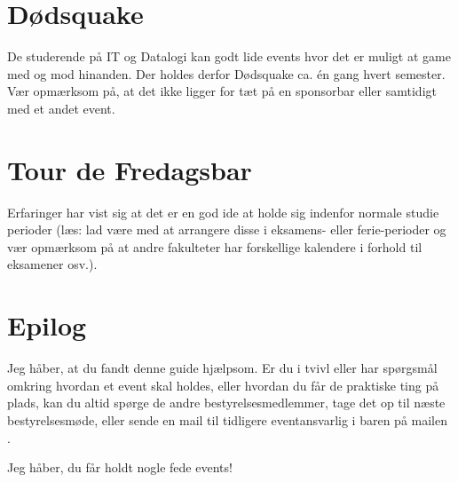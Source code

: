 \section{Dødsquake}
\label{sec:dodsquake}

De studerende på IT og Datalogi kan godt lide events hvor det er
muligt at game med og mod hinanden. Der holdes derfor Dødsquake ca. én
gang hvert semester. Vær opmærksom på, at det ikke ligger for tæt på
en sponsorbar eller samtidigt med et andet event.

\section{Tour de Fredagsbar}
\label{sec:tour-de-fredagsbar}

Erfaringer har vist sig at det er en god ide at holde sig indenfor
normale studie perioder (læs: lad være med at arrangere disse i
eksamens- eller ferie-perioder og vær opmærksom på at andre fakulteter
har forskellige kalendere i forhold til eksamener osv.).

\section{Epilog}
\label{sec:epilog}

Jeg håber, at du fandt denne guide hjælpsom. Er du i tvivl eller har
spørgsmål omkring hvordan et event skal holdes, eller hvordan du får
de praktiske ting på plads, kan du altid spørge de andre
bestyrelsesmedlemmer, tage det op til næste bestyrelsesmøde, eller
sende en mail til tidligere eventansvarlig i baren på mailen
.

Jeg håber, du får holdt nogle fede events!



